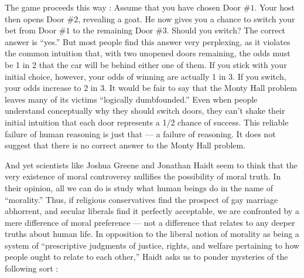 \documentclass[a4paper,14pt]{extbook}
\begin{document}
The game proceeds this way :
Assume that you have chosen Door $\#1$.
Your host then opens Door $\#2$, revealing a goat.
He now gives you a chance to switch your bet from Door $\#1$ to the remaining Door $\#3$.
Should you switch? The correct answer is ``yes.''
But most people find this answer very perplexing, as it violates the common intuition that, with two unopened doors remaining, the odds must be 1 in 2 that the car will be behind either one of them.
If you stick with your initial choice, however, your odds of winning are actually 1 in 3.
If you switch, your odds increase to 2 in 3.
It would be fair to say that the Monty Hall problem leaves many of its victims ``logically dumbfounded.''
Even when people understand conceptually why they should switch doors, they can't shake their initial intuition that each door represents a 1/2 chance of success.
This reliable failure of human reasoning is just that --- a failure of reasoning.
It does not suggest that there is no correct answer to the Monty Hall problem.

And yet scientists like Joshua Greene and Jonathan Haidt seem to think that the very existence of moral controversy nullifies the possibility of moral truth.
In their opinion, all we can do is study what human beings do in the name of ``morality.''
Thus, if religious conservatives find the prospect of gay marriage abhorrent, and secular liberals find it perfectly acceptable, we are confronted by a mere difference of moral preference --- not a difference that relates to any deeper truths about human life.
In opposition to the liberal notion of morality as being a system of ``prescriptive judgments of justice, rights, and welfare pertaining to how people ought to relate to each other,'' Haidt asks us to ponder mysteries of the following sort :
\end{document}
